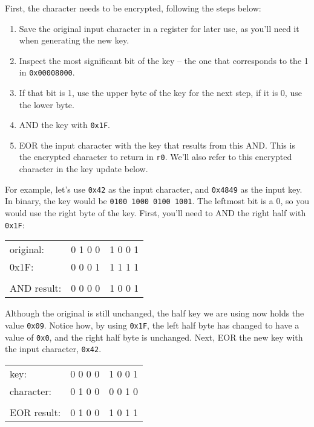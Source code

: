 \documentclass{article}
\def\r#1{\texttt{r#1}}
\begin{document}
First, the character needs to be encrypted, following the steps below:

\begin{enumerate} \item Save the original input character in a register for 
later use, as you'll need it when generating the new key.
\item Inspect the most significant bit of the key -- the one that corresponds
to the 1 in {\tt 0x00008000}.
\item If that bit is 1, use the upper byte of the key for the next step, if it
is 0, use the lower byte.
\item AND the key with {\tt 0x1F}.
\item EOR the input character with the key that results from this AND. This is
the encrypted character to return in \r{0}. We'll also refer to this encrypted
character in the key update below.
\end{enumerate}

For example, let's use {\tt 0x42} as the input character, and 
{\tt 0x4849} as the input key. In binary, the key would be {\tt 0100 1000 
0100 1001}. The leftmost bit is a 0, so you would use the right byte of the 
key. First, you'll need to AND the right half with {\tt 0x1F}:
\begin{center}
  \begin{tabular}{lll}
    original: & 0 1 0 0 & 1 0 0 1 \\
    0x1F: & 0 0 0 1 & 1 1 1 1 \\
    \hline \\
    AND result: & 0 0 0 0 & 1 0 0 1 \\
  \end{tabular}
\end{center}

Although the original is still unchanged, the half key we are using now holds
the value {\tt 0x09}. Notice how, by using {\tt 0x1F}, the left half byte has 
changed to have a value of {\tt 0x0}, and the right half byte is unchanged. 
Next, EOR the new key with the input character, {\tt 0x42}.
\begin{center}
  \begin{tabular}{lll}
    key: & 0 0 0 0 & 1 0 0 1 \\
    character: & 0 1 0 0 & 0 0 1 0 \\
    \hline \\
    EOR result: & 0 1 0 0 & 1 0 1 1 \\
  \end{tabular}
\end{center}
\end{document}
